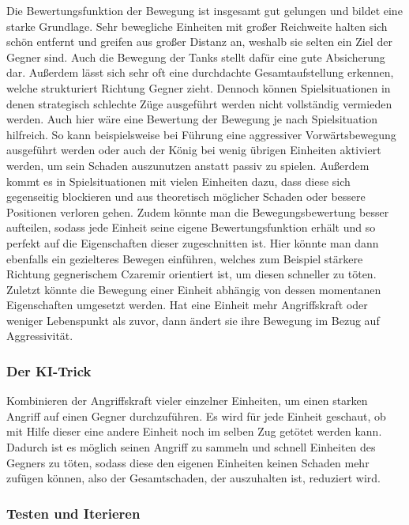 Die Bewertungsfunktion der Bewegung ist insgesamt gut gelungen und bildet eine starke Grundlage. Sehr bewegliche Einheiten mit großer Reichweite halten sich schön entfernt und greifen aus großer Distanz an, weshalb sie selten ein Ziel der Gegner sind. Auch die Bewegung der Tanks stellt dafür eine gute Absicherung dar. Außerdem lässt sich sehr oft eine durchdachte Gesamtaufstellung erkennen, welche strukturiert Richtung Gegner zieht. 
Dennoch können Spielsituationen in denen strategisch schlechte Züge ausgeführt werden nicht vollständig vermieden werden. Auch hier wäre eine Bewertung der Bewegung je nach Spielsituation hilfreich. So kann beispielsweise bei Führung eine aggressiver Vorwärtsbewegung ausgeführt werden oder auch der König bei wenig übrigen Einheiten aktiviert werden, um sein Schaden auszunutzen anstatt passiv zu spielen. Außerdem kommt es in Spielsituationen mit vielen Einheiten dazu, dass diese sich gegenseitig blockieren und aus theoretisch möglicher Schaden oder bessere Positionen verloren gehen. Zudem könnte man die Bewegungsbewertung besser aufteilen, sodass jede Einheit seine eigene Bewertungsfunktion erhält und so perfekt auf die Eigenschaften dieser zugeschnitten ist. Hier könnte man dann ebenfalls ein gezielteres Bewegen einführen, welches zum Beispiel stärkere Richtung gegnerischem Czaremir orientiert ist, um diesen schneller zu töten. Zuletzt könnte die Bewegung einer Einheit abhängig von dessen momentanen Eigenschaften umgesetzt werden. Hat eine Einheit mehr Angriffskraft oder weniger Lebenspunkt als zuvor, dann ändert sie ihre Bewegung im Bezug auf Aggressivität. 


\subsubsection{Der KI-Trick}

Kombinieren der Angriffskraft vieler einzelner Einheiten, um einen starken Angriff auf einen Gegner durchzuführen. Es wird für jede Einheit geschaut, ob mit Hilfe dieser eine andere Einheit noch im selben Zug getötet werden kann. Dadurch ist es möglich seinen Angriff zu sammeln und schnell Einheiten des Gegners zu töten, sodass diese den eigenen Einheiten keinen Schaden mehr zufügen können, also der Gesamtschaden, der auszuhalten ist, reduziert wird.

\subsubsection{Testen und Iterieren}

